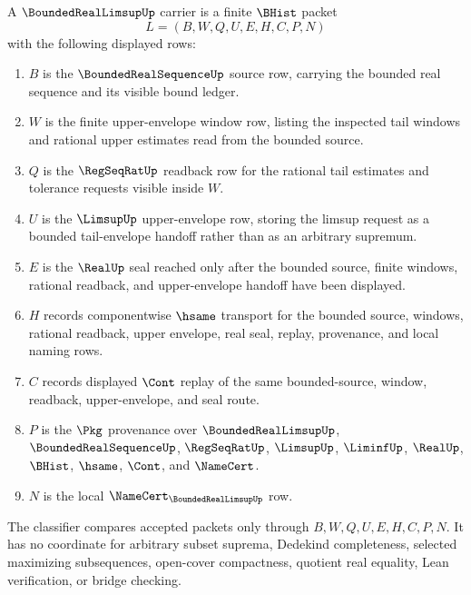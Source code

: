 \begin{definition}
\label{def:bounded-real-limsup-carrier}
A $\BoundedRealLimsupUp$ carrier is a finite $\BHist$ packet
$$
L=(B,W,Q,U,E,H,C,P,N)
$$
with the following displayed rows:
\begin{enumerate}
\item $B$ is the $\BoundedRealSequenceUp$ source row, carrying the bounded real sequence and its visible bound ledger.
\item $W$ is the finite upper-envelope window row, listing the inspected tail windows and rational upper estimates read from the bounded source.
\item $Q$ is the $\RegSeqRatUp$ readback row for the rational tail estimates and tolerance requests visible inside $W$.
\item $U$ is the $\LimsupUp$ upper-envelope row, storing the limsup request as a bounded tail-envelope handoff rather than as an arbitrary supremum.
\item $E$ is the $\RealUp$ seal reached only after the bounded source, finite windows, rational readback, and upper-envelope handoff have been displayed.
\item $H$ records componentwise $\hsame$ transport for the bounded source, windows, rational readback, upper envelope, real seal, replay, provenance, and local naming rows.
\item $C$ records displayed $\Cont$ replay of the same bounded-source, window, readback, upper-envelope, and seal route.
\item $P$ is the $\Pkg$ provenance over $\BoundedRealLimsupUp$, $\BoundedRealSequenceUp$, $\RegSeqRatUp$, $\LimsupUp$, $\LiminfUp$, $\RealUp$, $\BHist$, $\hsame$, $\Cont$, and $\NameCert$.
\item $N$ is the local $\NameCert_{\BoundedRealLimsupUp}$ row.
\end{enumerate}
The classifier compares accepted packets only through $B,W,Q,U,E,H,C,P,N$. It has no coordinate for arbitrary subset suprema, Dedekind completeness, selected maximizing subsequences, open-cover compactness, quotient real equality, Lean verification, or bridge checking.
\end{definition}

